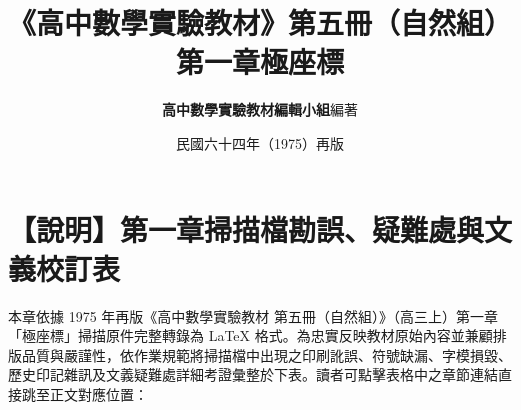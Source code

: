 \documentclass[a4paper,12pt,twoside]{article}
\title{\LARGE\textbf{《高中數學實驗教材》第五冊（自然組）}\\[0.5em] \Large\textbf{第一章\quad 極座標}}
\author{\textbf{高中數學實驗教材編輯小組}\quad 編著}
\date{民國六十四年（1975）再版}
\begin{document}
\maketitle
\thispagestyle{firstpage}

\section*{【說明】第一章掃描檔勘誤、疑難處與文義校訂表}
\label{sec:errata_notes_b5_ch1}

本章依據 1975 年再版《高中數學實驗教材 第五冊（自然組）》（高三上）第一章「極座標」掃描原件完整轉錄為 \LaTeX{} 格式。為忠實反映教材原始內容並兼顧排版品質與嚴謹性，依作業規範將掃描檔中出現之印刷訛誤、符號缺漏、字模損毀、歷史印記雜訊及文義疑難處詳細考證彙整於下表。讀者可點擊表格中之章節連結直接跳至正文對應位置：
\end{document}
